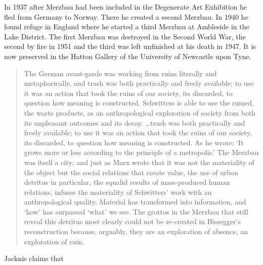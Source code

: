In 1937 after Merzbau had been included in the Degenerate Art Exhibition he fled from Germany to Norway. There he created a second Merzbau. In 1940 he found refuge in England where he started a third Merzbau at Ambleside in the Lake District. The first Merzbau was destroyed in the Second World War, the second by fire in 1951 and the third was left unfinished at his death in 1947. It is now preserved in the Hatton Gallery of the University of Newcastle upon Tyne.


\begin{quote}
The German avant-garde was working from ruins literally and metaphorically, and trash was both practically and freely available; to use it was an action that took the ruins of our society, its discarded, to question how meaning is constructed. Schwitters is able to use the ruined, the waste products, as an anthropological exploration of society from both its unpleasant outcomes and its decay. \ldots trash was both practically and freely available; to use it was an action that took the ruins of our society, its discarded, to question how meaning is constructed. As he wrote: ‘It grows more or less according to the principle of a metropolis.’ The Merzbau was itself a city; and just as Marx wrote that it was not the materiality of the object but the social relations that create value, the use of urban detritus in particular, the squalid results of mass-produced human relations, infuses the materiality of Schwitters’ work with an anthropological quality. Material has transformed into information, and ‘how’ has surpassed ‘what’ we see. The grottos in the Merzbau that still reveal this detritus most clearly could not be re-created in Bissegger’s reconstruction because, arguably, they are an exploration of absence, an exploration of ruin. \citep{carroll2011ruin}
\end{quote}

Jacknis claims that  \citep[as cited in][]{cerny1996recycled}

